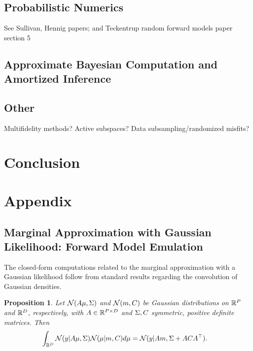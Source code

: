 \documentclass[12pt]{article}
\newtheorem{prop}{Proposition}
\begin{document}
\subsection{Probabilistic Numerics} \label{sec:prob-numerics}
See Sullivan, Hennig papers; and Teckentrup random forward models paper section 5

\subsection{Approximate Bayesian Computation and Amortized Inference} \label{sec:abc}
\citet{Lueckmann2018LikelihoodfreeIW,VehtariParallelGP,ABCApproxLik,
BurknerAmortized,llikEmABC,ABCGP}

\subsection{Other}
Multifidelity methods? Active subspaces? Data subsampling/randomized misfits?

\section{Conclusion} \label{sec:conclusion}


\section{Appendix}

\subsection{Marginal Approximation with Gaussian Likelihood: Forward Model Emulation}
The closed-form computations related to the marginal approximation with a Gaussian 
likelihood follow from standard results regarding the convolution of Gaussian densities.  

\begin{prop} \label{Gaussian_convolution}
Let $\mathcal{N}(A \mu, \Sigma)$ and $\mathcal{N}(m, C)$ be Gaussian distributions on $\mathbb{R}^{P}$ and $\mathbb{R}^{D}$, 
respectively, with $A \in \mathbb{R}^{P \times D}$ and $\Sigma, C$ symmetric, positive definite matrices. Then 
\begin{align*}
\int_{\mathbb{R}^{D}} \mathcal{N}(y | A \mu, \Sigma) \mathcal{N}(\mu | m, C) d\mu
&= \mathcal{N}(y | Am, \Sigma + ACA^\top). 
\end{align*}
\end{prop}
\end{document}

